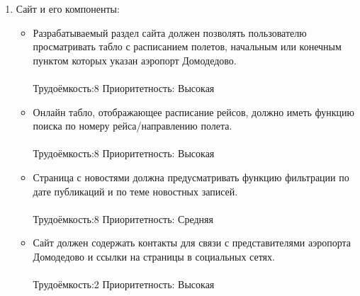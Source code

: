 \begin{enumerate}
      \item Сайт и его компоненты:
      \begin{itemize}
            \item Разрабатываемый раздел сайта должен позволять
            пользователю просматривать табло с расписанием
            полетов, начальным или конечным пунктом которых
            указан аэропорт Домодедово.
            \\\\
            Трудоёмкость:8    Приоритетность: Высокая
            \\
            \item Онлайн табло, отображающее расписание рейсов,
            должно иметь функцию поиска по номеру
            рейса/направлению полета.
            \\\\
            Трудоёмкость:8    Приоритетность: Высокая
            \\
            \item Страница с новостями должна предусматривать
            функцию фильтрации по дате публикаций и по
            теме новостных записей.
            \\\\
            Трудоёмкость:8    Приоритетность: Средняя
            \\
            \item Сайт должен содержать контакты для связи с
            представителями аэропорта Домодедово и ссылки
            на страницы в социальных сетях.
            \\\\
            Трудоёмкость:2    Приоритетность: Высокая
      \end{itemize}


\end{enumerate}

